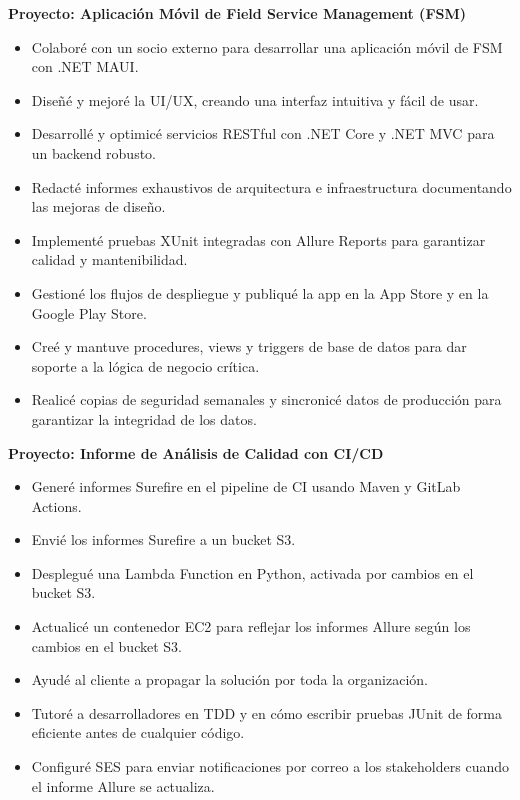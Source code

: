 \documentclass[10pt,a4paper]{altacv}
\begin{document}
\textbf{Proyecto: Aplicación Móvil de Field Service Management (FSM)}
\begin{itemize}
    \setlength{\itemindent}{0.5em}
    \item[--] Colaboré con un socio externo para desarrollar una aplicación móvil de FSM con .NET MAUI.
    \item[--] Diseñé y mejoré la UI/UX, creando una interfaz intuitiva y fácil de usar.
    \item[--] Desarrollé y optimicé servicios RESTful con .NET Core y .NET MVC para un backend robusto.
    \item[--] Redacté informes exhaustivos de arquitectura e infraestructura documentando las mejoras de diseño.
    \item[--] Implementé pruebas XUnit integradas con Allure Reports para garantizar calidad y mantenibilidad.
    \item[--] Gestioné los flujos de despliegue y publiqué la app en la App Store y en la Google Play Store.
    \item[--] Creé y mantuve procedures, views y triggers de base de datos para dar soporte a la lógica de negocio crítica.
    \item[--] Realicé copias de seguridad semanales y sincronicé datos de producción para garantizar la integridad de los datos.
\end{itemize}



\textbf{Proyecto: Informe de Análisis de Calidad con CI/CD}
\begin{itemize}
    \setlength{\itemindent}{0.5em}
    \item[--] Generé informes Surefire en el pipeline de CI usando Maven y GitLab Actions.
    \item[--] Envié los informes Surefire a un bucket S3.
    \item[--] Desplegué una Lambda Function en Python, activada por cambios en el bucket S3.
    \item[--] Actualicé un contenedor EC2 para reflejar los informes Allure según los cambios en el bucket S3.
    \item[--] Ayudé al cliente a propagar la solución por toda la organización.
    \item[--] Tutoré a desarrolladores en TDD y en cómo escribir pruebas JUnit de forma eficiente antes de cualquier código.
    \item[--] Configuré SES para enviar notificaciones por correo a los stakeholders cuando el informe Allure se actualiza.
\end{itemize}
\end{document}

